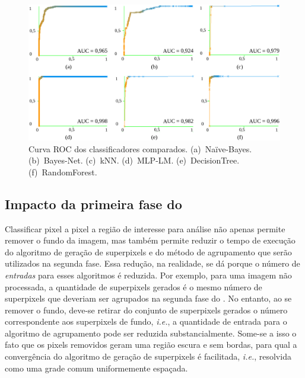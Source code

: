 \begin{figure}[!htb]
\centering
\includegraphics[scale=.85]{_fig/roc.pdf}
\caption[Curva ROC dos classificadores comparados.]{Curva ROC dos classificadores comparados.
(a)~Na\"ive-Bayes.
(b)~Bayes-Net.
(c)~kNN.
(d)~MLP-LM.
(e)~DecisionTree.
(f)~RandomForest.}
\label{fig:roc}
\end{figure}	


\subsection{Impacto da primeira fase do \system} \label{sec:exp_dbcscan}

Classificar pixel a pixel a região de interesse para análise não apenas permite remover o fundo da imagem, mas também permite reduzir o tempo de execução do algoritmo de geração de superpixels e do método de agrupamento que serão utilizados na segunda fase.
Essa redução, na realidade, se dá porque o número de \textit{entradas} para esses algoritmos é reduzida.
Por exemplo, para uma imagem não processada, a quantidade de superpixels gerados é o mesmo número de superpixels que deveriam ser agrupados na segunda fase do \system.
No entanto, ao se remover o fundo, deve-se retirar do conjunto de superpixels gerados o número correspondente aos superpixels de fundo, \textit{i.e.}, a quantidade de entrada para o algoritmo de agrupamento pode ser reduzida substancialmente.
Some-se a isso o fato que os pixels removidos geram uma região escura e sem bordas, para qual a convergência do algoritmo de geração de superpixels é facilitada, \textit{i.e.}, resolvida como uma grade comum uniformemente espaçada.

